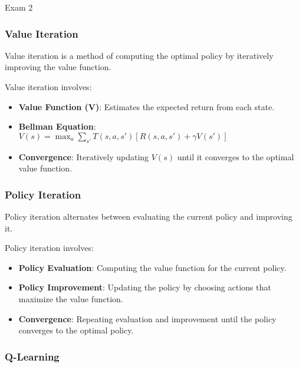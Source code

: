 \begin{examnotes}{Exam 2}
    \subsubsection*{Value Iteration}
    
    Value iteration is a method of computing the optimal policy by iteratively improving the value function.
    
    \begin{highlight}
        Value iteration involves:
        \begin{itemize}
            \item \textbf{Value Function (V)}: Estimates the expected return from each state.
            \item \textbf{Bellman Equation}: $V(s) = \max_a \sum_{s'} T(s, a, s') [R(s, a, s') + \gamma V(s')]$
            \item \textbf{Convergence}: Iteratively updating $V(s)$ until it converges to the optimal value function.
        \end{itemize}
    \end{highlight}
    
    \subsubsection*{Policy Iteration}
    
    Policy iteration alternates between evaluating the current policy and improving it.
    
    \begin{highlight}
        Policy iteration involves:
        \begin{itemize}
            \item \textbf{Policy Evaluation}: Computing the value function for the current policy.
            \item \textbf{Policy Improvement}: Updating the policy by choosing actions that maximize the value function.
            \item \textbf{Convergence}: Repeating evaluation and improvement until the policy converges to the optimal policy.
        \end{itemize}
    \end{highlight}
    
    \subsubsection*{Q-Learning}
    

\end{examnotes}
